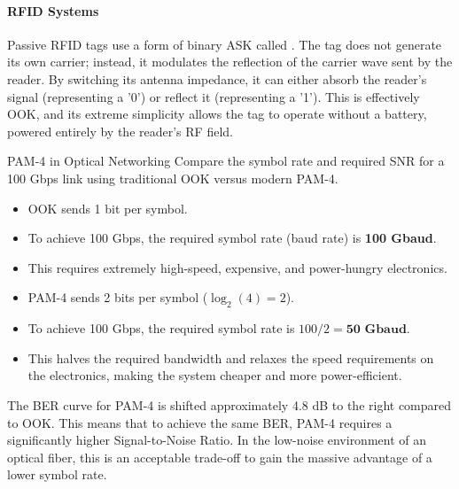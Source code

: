 \paragraph{RFID Systems}
Passive RFID tags use a form of binary ASK called . The tag does not generate its own carrier; instead, it modulates the reflection of the carrier wave sent by the reader. By switching its antenna impedance, it can either absorb the reader's signal (representing a '0') or reflect it (representing a '1'). This is effectively OOK, and its extreme simplicity allows the tag to operate without a battery, powered entirely by the reader's RF field.


\begin{workedexample}{PAM-4 in Optical Networking}
     Compare the symbol rate and required SNR for a 100 Gbps link using traditional OOK versus modern PAM-4.
    
    \begin{itemize}
        \item OOK sends 1 bit per symbol.
        \item To achieve 100 Gbps, the required symbol rate (baud rate) is \textbf{100 Gbaud}.
        \item This requires extremely high-speed, expensive, and power-hungry electronics.
    \end{itemize}

    \begin{itemize}
        \item PAM-4 sends 2 bits per symbol ($\log_2(4)=2$).
        \item To achieve 100 Gbps, the required symbol rate is $100 / 2 = \textbf{50 Gbaud}$.
        \item This halves the required bandwidth and relaxes the speed requirements on the electronics, making the system cheaper and more power-efficient.
    \end{itemize}
     The BER curve for PAM-4 is shifted approximately 4.8 dB to the right compared to OOK. This means that to achieve the same BER, PAM-4 requires a significantly higher Signal-to-Noise Ratio. In the low-noise environment of an optical fiber, this is an acceptable trade-off to gain the massive advantage of a lower symbol rate.
\end{workedexample}


